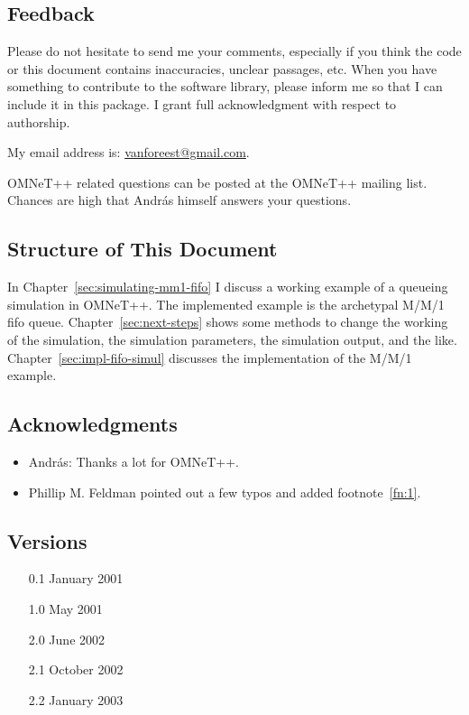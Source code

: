 \documentclass[a4paper]{article}
\begin{document}
\subsection{Feedback}
\label{sec:feedback}
Please do not hesitate to send me your comments, especially if you
think the code or this document contains inaccuracies, unclear
passages, etc. When you have something to contribute to the software
library, please inform me so that I can include it in this package. I
grant full acknowledgment with respect to authorship.

My email address is: \url{vanforeest@gmail.com}.

OMNeT++ related questions can be posted at the OMNeT++ mailing list.
Chances are high that Andr{\'a}s himself answers your questions.


\subsection{Structure of This Document}
\label{sec:struct-this-docum}
In Chapter~\ref{sec:simulating-mm1-fifo} I discuss a working example
of a queueing simulation in OMNeT++.  The implemented example is the
archetypal M/M/1 fifo queue.  Chapter~\ref{sec:next-steps} shows some
methods to change the working of the simulation, the simulation
parameters, the simulation output, and the like.
Chapter~\ref{sec:impl-fifo-simul} discusses the
implementation of the M/M/1 example.

\subsection{Acknowledgments}
\label{sec:acknowledgements}
\begin{itemize}
\item Andr{\'a}s: Thanks a lot for OMNeT++.
\item Phillip M. Feldman pointed out a few typos and added footnote~\ref{fn:1}.

\end{itemize}

\subsection{Versions}
\begin{enumerate}
\item[0.1] January 2001
\item[1.0] May 2001
\item[2.0] June 2002
\item[2.1] October 2002
\item[2.2] January 2003
\end{enumerate}
\end{document}
